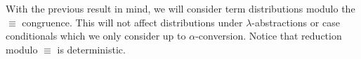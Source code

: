 \begin{convention}
  With the previous result in mind, we will consider term distributions modulo the $\equiv$ congruence. This will not affect distributions under $\lambda$-abstractions or case conditionals which we only consider up to $\alpha$-conversion. Notice that reduction modulo $\equiv$ is deterministic.
\end{convention}
